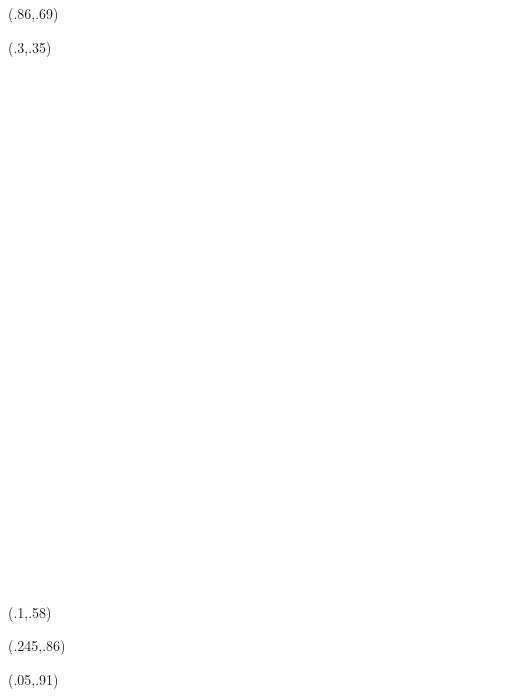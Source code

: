 \begin{textblock}{.45}(.86,.69)
	\noindent {\fontsize{24.74}{18}%
		\textcolor{white}{$\displaystyle E=mc^2$}}
\end{textblock}

\begin{textblock}{.4}(.3,.35)
	\begin{center}
		\includegraphics[width=.2\paperwidth]{images/unitologo}
	\end{center}
\end{textblock}

\begin{textblock}{.6}(.1,.58)
\end{textblock}


\begin{textblock}{.3}(.245,.86)
\end{textblock}

\begin{textblock}{.4}(.05,.91)
\end{textblock}

